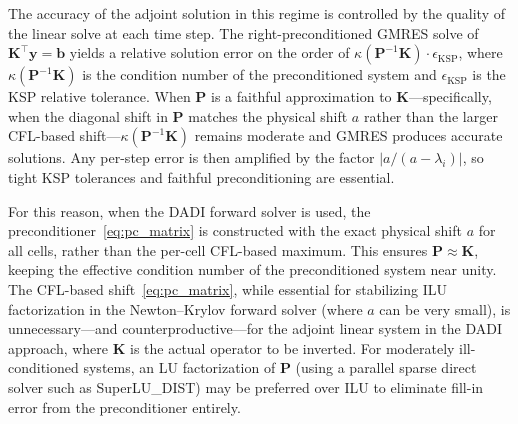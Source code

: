 \documentclass[journal]{new-aiaa}
\newcommand{\mb}[1]{\mathbf{#1}}
\begin{document}
The accuracy of the adjoint solution in this regime is controlled by the quality of the linear solve at each time step.
The right-preconditioned GMRES solve of $\mb{K}^\intercal \mb{y} = \mb{b}$ yields a relative solution error on the order of $\kappa(\mb{P}^{-1}\mb{K}) \cdot \epsilon_{\text{KSP}}$, where $\kappa(\mb{P}^{-1}\mb{K})$ is the condition number of the preconditioned system and $\epsilon_{\text{KSP}}$ is the KSP relative tolerance.
When $\mb{P}$ is a faithful approximation to $\mb{K}$---specifically, when the diagonal shift in $\mb{P}$ matches the physical shift $a$ rather than the larger CFL-based shift---$\kappa(\mb{P}^{-1}\mb{K})$ remains moderate and GMRES produces accurate solutions.
Any per-step error is then amplified by the factor $|a/(a - \lambda_i)|$, so tight KSP tolerances and faithful preconditioning are essential.

For this reason, when the DADI forward solver is used, the preconditioner~\eqref{eq:pc_matrix} is constructed with the exact physical shift $a$ for all cells, rather than the per-cell CFL-based maximum.
This ensures $\mb{P} \approx \mb{K}$, keeping the effective condition number of the preconditioned system near unity.
The CFL-based shift~\eqref{eq:pc_matrix}, while essential for stabilizing ILU factorization in the Newton--Krylov forward solver (where $a$ can be very small), is unnecessary---and counterproductive---for the adjoint linear system in the DADI approach, where $\mb{K}$ is the actual operator to be inverted.
For moderately ill-conditioned systems, an LU factorization of $\mb{P}$ (using a parallel sparse direct solver such as SuperLU\_DIST) may be preferred over ILU to eliminate fill-in error from the preconditioner entirely.
\end{document}
